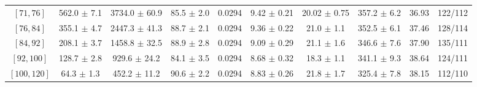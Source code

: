 \begin{tabular}{c||c|c|c|c|c|c|c||c|c}
$[71, 76]$ & 562.0 $\pm$ 7.1 & 3734.0 $\pm$ 60.9 & 85.5 $\pm$ 2.0 & 0.0294 & 9.42 $\pm$ 0.21 & 20.02 $\pm$ 0.75 & 357.2 $\pm$ 6.2 & 36.93 & 122/112\\
$[76, 84]$ & 355.1 $\pm$ 4.7 & 2447.3 $\pm$ 41.3 & 88.7 $\pm$ 2.1 & 0.0294 & 9.36 $\pm$ 0.22 & 21.0 $\pm$ 1.1 & 352.5 $\pm$ 6.1 & 37.46 & 128/114\\
$[84, 92]$ & 208.1 $\pm$ 3.7 & 1458.8 $\pm$ 32.5 & 88.9 $\pm$ 2.8 & 0.0294 & 9.09 $\pm$ 0.29 & 21.1 $\pm$ 1.6 & 346.6 $\pm$ 7.6 & 37.90 & 135/111\\
$[92, 100]$ & 128.7 $\pm$ 2.8 & 929.6 $\pm$ 24.2 & 84.1 $\pm$ 3.5 & 0.0294 & 8.68 $\pm$ 0.32 & 18.3 $\pm$ 1.1 & 341.1 $\pm$ 9.3 & 38.64 & 124/111\\
$[100, 120]$ & 64.3 $\pm$ 1.3 & 452.2 $\pm$ 11.2 & 90.6 $\pm$ 2.2 & 0.0294 & 8.83 $\pm$ 0.26 & 21.8 $\pm$ 1.7 & 325.4 $\pm$ 7.8 & 38.15 & 112/110\\
\end{tabular}
